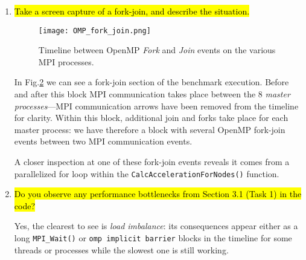 \documentclass{article}
\begin{document}
\begin{enumerate}
	The Communication Matrix view highlights how each process communicates with any other process, in a fully interconnected way. However, if the metric used is \emph{Number of messages} or \emph{Aggregated message volume}, the Communication Matrix, shown in Fig.\ref{fig:commuMatrix}, appears to reveal the topology used for the MPI processes. Indeed the most used connection paths form a symmetric pattern---although not exactly symmetric in intensity---which suggests a \emph{neighbourhood} relationship.

	\begin{figure}[p] %
		\begin{center}
			\texttt{[image: commuMatrix.png]}
		\cprotect\caption{The \emph{hot} connections (in red and green) appear to reveal the topology used for MPI procesess.}
		\label{fig:commuMatrix}
		\end{center}
	\end{figure}

	\item \hl{Take a screen capture of a fork-join, and describe the situation.} ~

	\begin{figure}[p] %
		\begin{center}
			\texttt{[image: OMP\_fork\_join.png]}
		\cprotect\caption{Timeline between OpenMP \emph{Fork} and \emph{Join} events on the various MPI processes.}
		\label{fig:ompForkJoin}
		\end{center}
	\end{figure}

	In Fig.\ref{fig:ompForkJoin} we can see a fork-join section of the benchmark execution. Before and after this block MPI communication takes place between the 8 \emph{master processes}---MPI communication arrows have been removed from the timeline for clarity. Within this block, additional join and forks take place for each master process: we have therefore a block with several OpenMP fork-join events between two MPI communication events.

	A closer inspection at one of these fork-join events reveals it comes from a parallelized for loop within the \verb!CalcAccelerationForNodes()! function.

	\item \hl{Do you observe any performance bottlenecks from Section 3.1 (Task 1) in the code?} ~

	Yes, the clearest to see is \emph{load imbalance}: its consequences appear either as a long \verb!MPI_Wait()! or \verb!omp implicit barrier! blocks in the timeline for some threads or processes while the slowest one is still working.


\end{enumerate}
\end{document}
